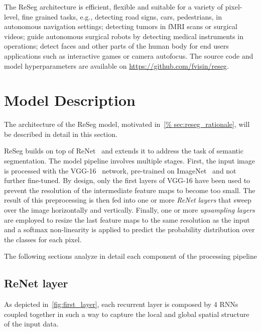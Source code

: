 The ReSeg architecture is efficient, flexible and suitable for a variety of
pixel-level, fine grained tasks, e.g., detecting road signs, cars, pedestrians,
in autonomous navigation settings; detecting tumors in fMRI scans or surgical
videos; guide autonomous surgical robots by detecting medical instruments in
operations; detect faces and other parts of the human body for end users
applications such as interactive games or camera autofocus.
The source code and model hyperparameters are available on
\href{https://github.com/fvisin/reseg}{https://github.com/fvisin/reseg}.


\section{Model Description}\label{sec:reseg_model}

The architecture of the ReSeg model, motivated in~\autoref{%
sec:reseg_rationale}, will be described in detail in this section.

ReSeg builds on top of ReNet~\cite{visin2015renet} and extends it to address
the task of semantic segmentation.  The model pipeline involves multiple
stages. First, the input image is processed with the VGG-16~\cite{Simonyan2015}
network, pre-trained on ImageNet~\cite{imagenet_cvpr09} and not further
fine-tuned. By design, only the first layers of VGG-16 have been used to
prevent the resolution of the intermediate feature maps to become too small.
The result of this preprocessing is then fed into one or more \emph{ReNet
layers} that sweep over the image horizontally and vertically. Finally, one or
more \emph{upsampling layers} are employed to resize the last feature maps to
the same resolution as the input and a softmax non-linearity is applied to
predict the probability distribution over the classes for each pixel.

The following sections analyze in detail each component of the processing
pipeline

\subsection{ReNet layer}

As depicted in~\autoref{fig:first_layer}, each recurrent layer is composed
by 4 RNNs coupled together in such a way to capture the local and global
spatial structure of the input data.

